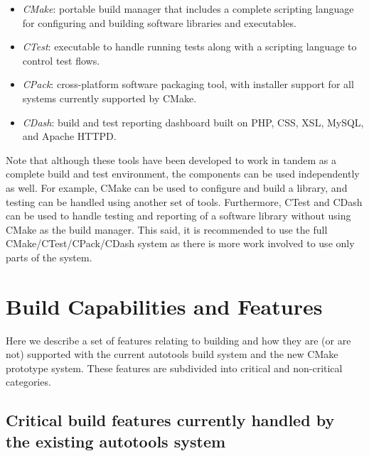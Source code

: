\documentclass[pdf,ps2pdf,11pt]{SANDreport}
\begin{document}
\begin{itemize}
 {}\item {\em CMake}: portable build manager that includes a complete
 scripting language for configuring and building software libraries and
 executables.

 {}\item {\em CTest}: executable to handle running tests along with a
 scripting language to control test flows.

 {}\item {\em CPack}: cross-platform software packaging tool, with
 installer support for all systems currently supported by CMake.

 {}\item {\em CDash}: build and test reporting dashboard built on PHP,
 CSS, XSL, MySQL, and Apache HTTPD.

\end{itemize} 

Note that although these tools have been developed to work in tandem
as a complete build and test environment, the components can be used
independently as well. For example, CMake can be used to configure and
build a library, and testing can be handled using another set of
tools. Furthermore, CTest and CDash can be used to handle testing and
reporting of a software library without using CMake as the build
manager. This said, it is recommended to use the full
CMake/CTest/CPack/CDash system as there is more work involved to use
only parts of the system.

%
\section{Build Capabilities and Features}
%

Here we describe a set of features relating to building and how they
are (or are not) supported with the current autotools build system and
the new CMake prototype system.  These features are subdivided into
critical and non-critical categories.


%
{}\subsection{Critical build features currently handled by the
existing autotools system}
%
\end{document}

